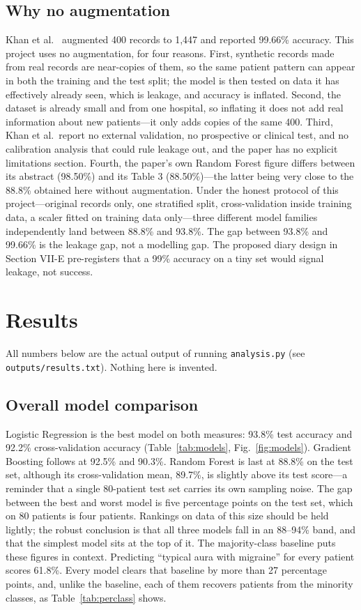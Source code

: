 \documentclass[conference]{IEEEtran}
\begin{document}
\subsection{Why no augmentation}
Khan et al.~\cite{khan2024} augmented 400 records to 1,447 and reported 99.66\% accuracy. This project uses no augmentation, for four reasons. First, synthetic records made from real records are near-copies of them, so the same patient pattern can appear in both the training and the test split; the model is then tested on data it has effectively already seen, which is leakage, and accuracy is inflated. Second, the dataset is already small and from one hospital, so inflating it does not add real information about new patients---it only adds copies of the same 400. Third, Khan et al.\ report no external validation, no prospective or clinical test, and no calibration analysis that could rule leakage out, and the paper has no explicit limitations section. Fourth, the paper's own Random Forest figure differs between its abstract (98.50\%) and its Table 3 (88.50\%)---the latter being very close to the 88.8\% obtained here without augmentation. Under the honest protocol of this project---original records only, one stratified split, cross-validation inside training data, a scaler fitted on training data only---three different model families independently land between 88.8\% and 93.8\%. The gap between 93.8\% and 99.66\% is the leakage gap, not a modelling gap. The proposed diary design in Section VII-E pre-registers that a 99\% accuracy on a tiny set would signal leakage, not success.

\section{Results}
All numbers below are the actual output of running \texttt{analysis.py} (see \texttt{outputs/results.txt}). Nothing here is invented.

\subsection{Overall model comparison}
Logistic Regression is the best model on both measures: 93.8\% test accuracy and 92.2\% cross-validation accuracy (Table~\ref{tab:models}, Fig.~\ref{fig:models}). Gradient Boosting follows at 92.5\% and 90.3\%. Random Forest is last at 88.8\% on the test set, although its cross-validation mean, 89.7\%, is slightly above its test score---a reminder that a single 80-patient test set carries its own sampling noise. The gap between the best and worst model is five percentage points on the test set, which on 80 patients is four patients. Rankings on data of this size should be held lightly; the robust conclusion is that all three models fall in an 88--94\% band, and that the simplest model sits at the top of it. The majority-class baseline puts these figures in context. Predicting ``typical aura with migraine'' for every patient scores 61.8\%. Every model clears that baseline by more than 27 percentage points, and, unlike the baseline, each of them recovers patients from the minority classes, as Table~\ref{tab:perclass} shows.
\end{document}
